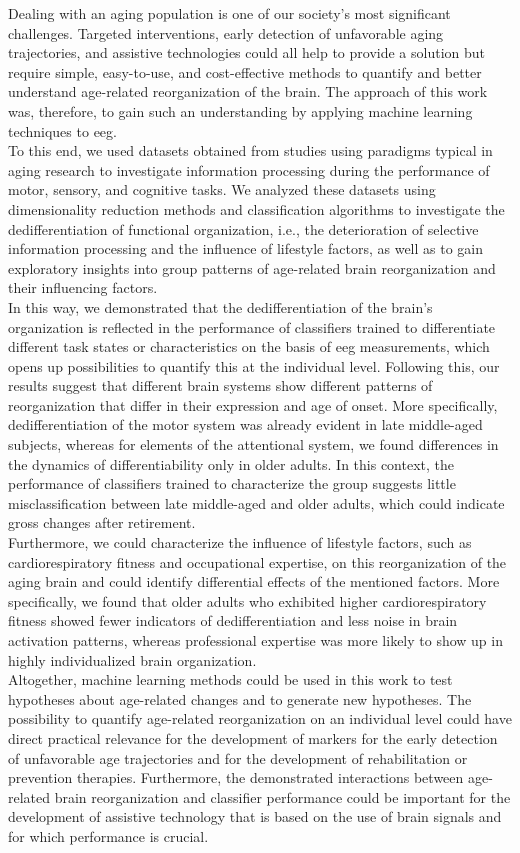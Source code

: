 Dealing with an aging population is one of our society's most significant challenges. Targeted interventions, early detection of unfavorable aging trajectories, and assistive technologies could all help to provide a solution but require simple, easy-to-use, and cost-effective methods to quantify and better understand age-related reorganization of the brain. The approach of this work was, therefore, to gain such an understanding by applying machine learning techniques to \gls{eeg}.\\
To this end, we used datasets obtained from studies using paradigms typical in aging research to investigate information processing during the performance of motor, sensory, and cognitive tasks. We analyzed these datasets using dimensionality reduction methods and classification algorithms to investigate the dedifferentiation of functional organization, i.e., the deterioration of selective information processing and the influence of lifestyle factors, as well as to gain exploratory insights into group patterns of age-related brain reorganization and their influencing factors.\\
In this way, we demonstrated that the dedifferentiation of the brain's organization is reflected in the performance of classifiers trained to differentiate different task states or characteristics on the basis of \gls{eeg} measurements, which opens up possibilities to quantify this at the individual level. Following this, our results suggest that different brain systems show different patterns of reorganization that differ in their expression and age of onset. More specifically, dedifferentiation of the motor system was already evident in late middle-aged subjects, whereas for elements of the attentional system, we found differences in the dynamics of differentiability only in older adults. In this context, the performance of classifiers trained to characterize the group suggests little misclassification between late middle-aged and older adults, which could indicate gross changes after retirement.\\
Furthermore, we could characterize the influence of lifestyle factors, such as cardiorespiratory fitness and occupational expertise, on this reorganization of the aging brain and could identify differential effects of the mentioned factors. More specifically, we found that older adults who exhibited higher cardiorespiratory fitness showed fewer indicators of dedifferentiation and less noise in brain activation patterns, whereas professional expertise was more likely to show up in highly individualized brain organization.\\
Altogether, machine learning methods could be used in this work to test hypotheses about age-related changes and to generate new hypotheses. The possibility to quantify age-related reorganization on an individual level could have direct practical relevance for the development of markers for the early detection of unfavorable age trajectories and for the development of rehabilitation or prevention therapies. Furthermore, the demonstrated interactions between age-related brain reorganization and classifier performance could be important for the development of assistive technology that is based on the use of brain signals and for which performance is crucial.


